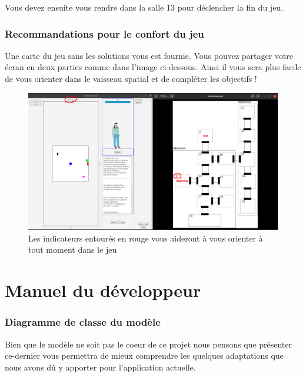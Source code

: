 \documentclass[./standalone.tex]{subfiles}
\begin{document}
Vous devez ensuite vous rendre dans la salle 13 pour déclencher la fin du jeu.


\section{Recommandations pour le confort du jeu}
Une carte du jeu sans les solutions vous est fournie. Vous pouvez partager votre écran en deux parties comme dans l’image ci-dessous. Ainsi il vous sera plus facile de vous orienter dans le vaisseau spatial et de compléter les objectifs !

\begin{center}
	\begin{figure}[h!]
	\includegraphics[scale=0.24]{images/conseils_utilisation.png}
	\caption{Les indicateurs entourés en rouge vous aideront à vous orienter à tout moment dans le jeu}
	\label{recommandations}
	\end{figure}
\end{center}


\newpage
\part{Manuel du développeur}

\section{Diagramme de classe du modèle}

Bien que le modèle ne soit pas le coeur de ce projet nous pensons que présenter ce-dernier vous permettra de mieux comprendre les quelques adaptations que nous avons dû y apporter pour l'application actuelle.\\
\end{document}
